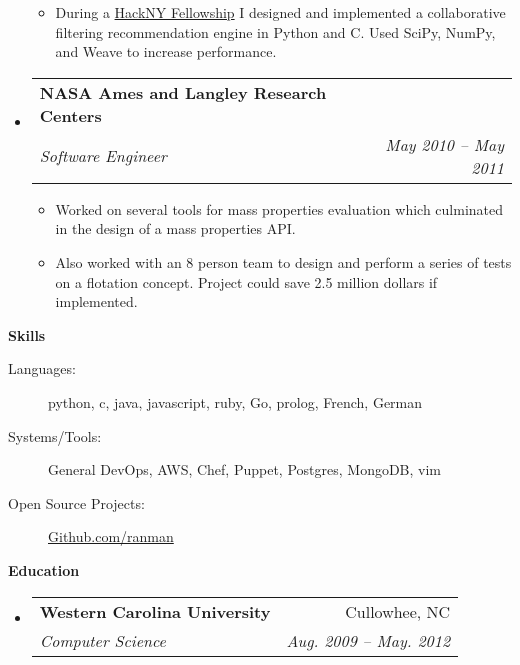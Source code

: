 \documentclass[letterpaper,8pt]{article}
\makeatletter
\newcommand{\resitem}[1]{\item #1 \vspace{-2pt}}
\newcommand{\resheading}[1]{{\large \colorbox{mygrey}{\begin{minipage}{\textwidth}{\textbf{#1 \vphantom{p\^{E}}}}\end{minipage}}}}
\newcommand{\ressubheading}[4]{
\begin{tabular*}{2.0in}{l@{\extracolsep{\fill}}r}
		\textbf{#1} & #2 \\
		\textit{#3} & \textit{#4} \\
\end{tabular*}\vspace{-6pt}}
\makeatother
\begin{document}
\begin{itemize}
    \begin{itemize}
        \resitem{During a \href{http://hackny.org/}{HackNY Fellowship} I designed and implemented a collaborative filtering recommendation engine in Python and C. Used SciPy, NumPy, and Weave to increase performance.}
    \end{itemize}
\item[]
   \ressubheading{NASA Ames and Langley Research Centers}{}{Software Engineer}{May 2010 -- May 2011}
   \begin{itemize}
      \resitem{Worked on several tools for mass properties evaluation which culminated in the design of a mass properties API.}
      \resitem{Also worked with an 8 person team to design and perform a series of tests on a flotation concept. Project could save 2.5 million dollars if implemented.}
   \end{itemize}
\end{itemize}
\resheading{Skills}
\begin{description}
\item[Languages:]
python, c, java, javascript, ruby, Go, prolog, French, German
\item[Systems/Tools:]
General DevOps, AWS, Chef, Puppet, Postgres, MongoDB, vim
\item[Open Source Projects:]
\href{https://github.com/ranman/}{Github.com/ranman}
\end{description}
\resheading{Education}
\begin{itemize}
\item
   \ressubheading{Western Carolina University}{Cullowhee, NC}{Computer Science}{Aug. 2009 -- May. 2012}
\end{itemize}
\end{document}
